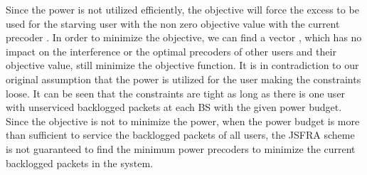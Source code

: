 Since the power is not utilized efficiently, the objective will force the excess  to be used for the starving user  with the non zero objective value with the current precoder . In order to minimize the objective, we can find a vector , which has no impact on the interference or the optimal precoders of other users and their objective value, still minimize the objective function. It is in contradiction to our original assumption that the power is utilized for the user  making the constraints loose. It can be seen that the constraints are tight as long as there is one user with unserviced backlogged packets at each \ac{BS} with the given power budget. Since the objective is not to minimize the power, when the power budget is more than sufficient to service the backlogged packets of all users, the \ac{JSFRA} scheme is not guaranteed to find the minimum power precoders to minimize the current backlogged packets in the system.
